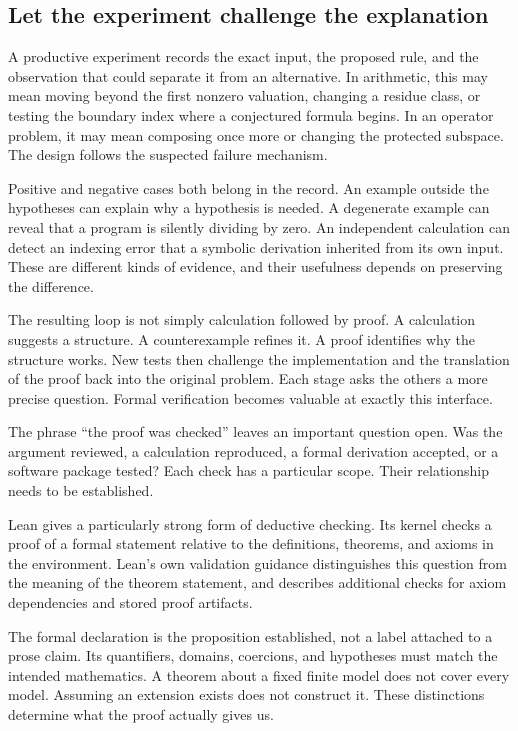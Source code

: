 \subsection{Let the experiment challenge the explanation}

A productive experiment records the exact input, the proposed rule, and the observation that could separate it from an alternative. In arithmetic, this may mean moving beyond the first nonzero valuation, changing a residue class, or testing the boundary index where a conjectured formula begins. In an operator problem, it may mean composing once more or changing the protected subspace. The design follows the suspected failure mechanism.

Positive and negative cases both belong in the record. An example outside the hypotheses can explain why a hypothesis is needed. A degenerate example can reveal that a program is silently dividing by zero. An independent calculation can detect an indexing error that a symbolic derivation inherited from its own input. These are different kinds of evidence, and their usefulness depends on preserving the difference.

The resulting loop is not simply calculation followed by proof. A calculation suggests a structure. A counterexample refines it. A proof identifies why the structure works. New tests then challenge the implementation and the translation of the proof back into the original problem. Each stage asks the others a more precise question. Formal verification becomes valuable at exactly this interface.


The phrase ``the proof was checked'' leaves an important question open. Was the argument reviewed, a calculation reproduced, a formal derivation accepted, or a software package tested? Each check has a particular scope. Their relationship needs to be established.

Lean gives a particularly strong form of deductive checking. Its kernel checks a proof of a formal statement relative to the definitions, theorems, and axioms in the environment. Lean's own validation guidance distinguishes this question from the meaning of the theorem statement, and describes additional checks for axiom dependencies and stored proof artifacts.

The formal declaration is the proposition established, not a label attached to a prose claim. Its quantifiers, domains, coercions, and hypotheses must match the intended mathematics. A theorem about a fixed finite model does not cover every model. Assuming an extension exists does not construct it. These distinctions determine what the proof actually gives us.

